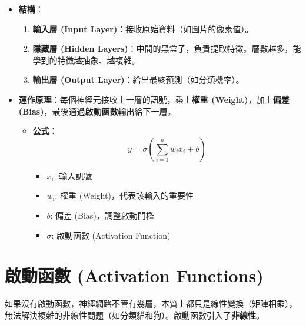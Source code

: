 \documentclass[
  letterpaper,
  DIV=11,
  numbers=noendperiod]{scrreprt}
\providecommand{\tightlist}{%
  \setlength{\itemsep}{0pt}\setlength{\parskip}{0pt}}
\begin{document}
\begin{itemize}
\tightlist
\item
  \textbf{結構}：

  \begin{enumerate}
  \def\labelenumi{\arabic{enumi}.}
  \tightlist
  \item
    \textbf{輸入層 (Input Layer)}：接收原始資料（如圖片的像素值）。
  \item
    \textbf{隱藏層 (Hidden
    Layers)}：中間的黑盒子，負責提取特徵。層數越多，能學到的特徵越抽象、越複雜。
  \item
    \textbf{輸出層 (Output Layer)}：給出最終預測（如分類機率）。
  \end{enumerate}
\item
  \textbf{運作原理}：每個神經元接收上一層的訊號，乘上\textbf{權重
  (Weight)}，加上\textbf{偏差
  (Bias)}，最後通過\textbf{啟動函數}輸出給下一層。

  \begin{itemize}
  \tightlist
  \item
    \textbf{公式}：\[ y = \sigma(\sum_{i=1}^{n} w_i x_i + b) \]

    \begin{itemize}
    \tightlist
    \item
      \(x_i\): 輸入訊號
    \item
      \(w_i\): 權重 (Weight)，代表該輸入的重要性
    \item
      \(b\): 偏差 (Bias)，調整啟動門檻
    \item
      \(\sigma\): 啟動函數 (Activation Function)
    \end{itemize}
  \end{itemize}
\end{itemize}

\section{啟動函數 (Activation
Functions)}\label{sec-activation-functions}

如果沒有啟動函數，神經網路不管有幾層，本質上都只是線性變換（矩陣相乘），無法解決複雜的非線性問題（如分類貓和狗）。啟動函數引入了\textbf{非線性}。
\end{document}
